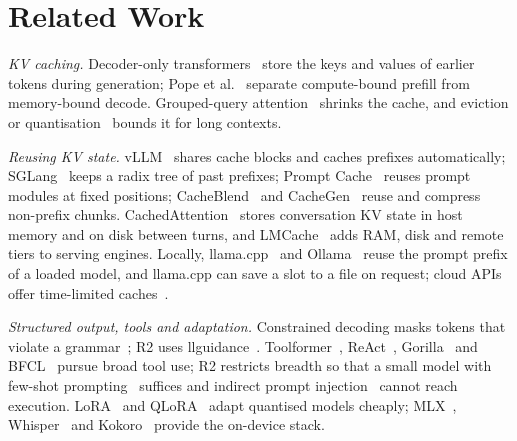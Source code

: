 \documentclass[journal]{IEEEtran}
\theoremstyle{definition}
\begin{document}
\section{Related Work}\label{sec:related}

\emph{KV caching.} Decoder-only transformers~\cite{vaswani2017attention} store the keys and values
of earlier tokens during generation; Pope et al.~\cite{pope2023efficiently} separate compute-bound
prefill from memory-bound decode. Grouped-query attention~\cite{shazeer2019fast,ainslie2023gqa}
shrinks the cache, and eviction or quantisation~\cite{xiao2024streamingllm,zhang2023h2o,
liu2024kivi,hooper2024kvquant} bounds it for long contexts.

\emph{Reusing KV state.} vLLM~\cite{kwon2023pagedattention} shares cache blocks and caches
prefixes automatically; SGLang~\cite{zheng2024sglang} keeps a radix tree of past prefixes; Prompt
Cache~\cite{gim2024promptcache} reuses prompt modules at fixed positions;
CacheBlend~\cite{yao2025cacheblend} and CacheGen~\cite{liu2024cachegen} reuse and compress
non-prefix chunks. CachedAttention~\cite{gao2024cachedattention} stores conversation KV state in
host memory and on disk between turns, and LMCache~\cite{cheng2025lmcache} adds RAM, disk and
remote tiers to serving engines. Locally, llama.cpp~\cite{gerganov2023llamacpp} and
Ollama~\cite{ollama2023} reuse the prompt prefix of a loaded model, and llama.cpp can save a slot to
a file on request; cloud APIs offer time-limited caches~\cite{anthropic2024promptcaching}.

\emph{Structured output, tools and adaptation.} Constrained decoding masks tokens that violate a
grammar~\cite{willard2023outlines,geng2023grammar,dong2025xgrammar,beurer2023lmql}; R2 uses
llguidance~\cite{llguidance2025}. Toolformer~\cite{schick2023toolformer},
ReAct~\cite{yao2023react}, Gorilla~\cite{patil2024gorilla} and BFCL~\cite{patil2025bfcl} pursue
broad tool use; R2 restricts breadth so that a small model with few-shot
prompting~\cite{brown2020language} suffices and indirect prompt injection~\cite{greshake2023injection}
cannot reach execution. LoRA~\cite{hu2022lora,aghajanyan2021intrinsic} and
QLoRA~\cite{dettmers2023qlora} adapt quantised models cheaply; MLX~\cite{hannun2023mlx},
Whisper~\cite{radford2023whisper} and Kokoro~\cite{hexgrad2024kokoro} provide the on-device stack.
\end{document}
